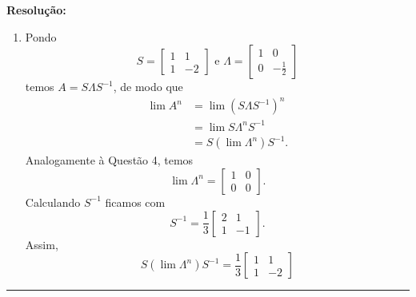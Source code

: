 \documentclass[leqno]{article}
\numberwithin{equation}{section}
\newenvironment{sol} 
{
    \vspace{4mm}
    \noindent\textbf{Resolução:}
    \strut\newline
    \smallskip
    \hspace{-3.5mm} 
} 
{\noindent\rule{4cm}{.1mm}}
\begin{document}
\begin{enumerate}
\begin{sol}
\begin{enumerate}[label=(\alph*)]
        \item Pondo
            \begin{equation*}
                S =
                \begin{bmatrix}
                    1 & 1 \\
                    1 & -2
                \end{bmatrix}
                \text{ e }
                \Lambda =
                \begin{bmatrix}
                    1 & 0 \\
                    0 & - \frac{ 1 }{ 2 }
                \end{bmatrix}
            \end{equation*}
            temos \( A = S \Lambda S^{ -1 } \), de modo que
            \begin{align*}
                \lim A^{ n } &= \lim ( S \Lambda S^{ -1 } )^{ n } \\
                             &= \lim S \Lambda^{ n } S^{ -1 } \\
                             &= S ( \lim \Lambda^{ n } ) S^{ -1 }
            .\end{align*}
            Analogamente à Questão 4, temos
            \begin{equation*}
                \lim \Lambda^{ n } =
                \begin{bmatrix}
                    1 & 0 \\
                    0 & 0
                \end{bmatrix}
            .\end{equation*}
            Calculando \( S^{ -1 } \) ficamos com
            \begin{equation*}
                S^{ -1 } =
                \frac{ 1 }{ 3 }
                \begin{bmatrix}
                    2 & 1 \\
                    1 & -1
                \end{bmatrix}
            .\end{equation*}
            Assim,
            \begin{equation*}
                S ( \lim \Lambda^{ n } ) S^{ -1 }
                =
                \frac{ 1 }{ 3 }
                \begin{bmatrix}
                    1 & 1 \\
                    1 & -2
                \end{bmatrix}

\end{equation*}
\end{enumerate}
\end{sol}
\end{enumerate}
\end{document}
